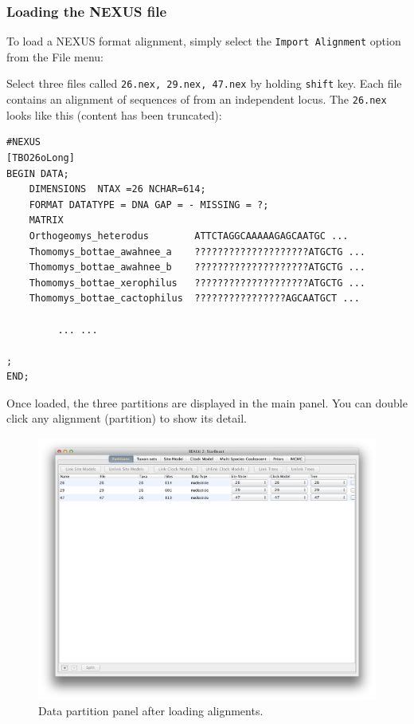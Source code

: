 \documentclass{article}
\begin{document}
\subsubsection*{Loading the NEXUS file }

To load a NEXUS format alignment, simply select the \texttt{Import
Alignment} option from the File menu: 

Select three files called \texttt{26.nex, 29.nex, 47.nex} by holding \texttt{shift} key. Each file contains an alignment of sequences of from an independent locus. The \texttt{26.nex} looks like this (content has been truncated):

\begin{verbatim}
#NEXUS
[TBO26oLong]
BEGIN DATA;
	DIMENSIONS  NTAX =26 NCHAR=614;
	FORMAT DATATYPE = DNA GAP = - MISSING = ?;
	MATRIX	
	Orthogeomys_heterodus        ATTCTAGGCAAAAAGAGCAATGC ...
	Thomomys_bottae_awahnee_a    ????????????????????ATGCTG ...
	Thomomys_bottae_awahnee_b    ????????????????????ATGCTG ...
	Thomomys_bottae_xerophilus   ????????????????????ATGCTG ...
	Thomomys_bottae_cactophilus  ????????????????AGCAATGCT ...

         ... ...

;
END;
\end{verbatim}

\medskip{}

Once loaded, the three partitions are displayed in the main panel.
You can double click any alignment (partition) to show its detail.

\begin{figure}
\begin{center}

\includegraphics[scale=0.4,clip=true,trim=0 300 0 0]{figures/BEAUti_DataPartitions}

\end{center}
\caption{\label{fig.datapartition} Data partition panel after loading alignments.}
\end{figure}
\end{document}
